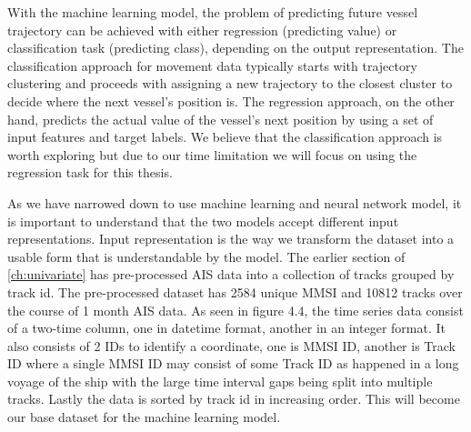 With the machine learning model, the problem of predicting future vessel trajectory can be achieved with either regression (predicting value) or classification task (predicting class), depending on the output representation. The classification approach for movement data typically starts with trajectory clustering and proceeds with assigning a new trajectory to the closest cluster to decide where the next vessel's position is. The regression approach, on the other hand, predicts the actual value of the vessel's next position by using a set of input features and target labels. We believe that the classification approach is worth exploring but due to our time limitation we will focus on using the regression task for this thesis.

As we have narrowed down to use machine learning and neural network model, it is important to understand that the two models accept different input representations. Input representation is the way we transform the dataset into a usable form that is understandable by the model. The earlier section of \ref{ch:univariate} has pre-processed AIS data into a collection of tracks grouped by track id. The pre-processed dataset has 2584 unique MMSI and 10812 tracks over the course of 1 month AIS data. As seen in figure 4.4, the time series data consist of a two-time column, one in datetime format, another in an integer format. It also consists of 2 IDs to identify a coordinate, one is MMSI ID, another is Track ID where a single MMSI ID may consist of some Track ID as happened in a long voyage of the ship with the large time interval gaps being split into multiple tracks. Lastly the data is sorted by track id in increasing order. This will become our base dataset for the machine learning model.

